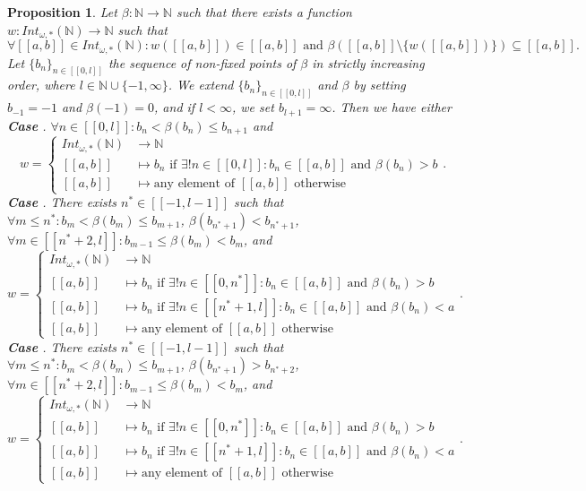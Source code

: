 \documentclass[a4paper,11pt]{article}
\newcommand*\circled[1]{\tikz[baseline=(char.base)]{
            \node[shape=circle,draw,inner sep=2pt] (char) {#1};}}
\theoremstyle{plain}
\newtheorem{proposition}{Proposition}[section]
\theoremstyle{definition}
\theoremstyle{remark}
\begin{document}
\begin{proposition}
\label{propBetaInt}
Let $\beta : \mathbb{N} \to \mathbb{N}$ such that there exists a function $w : Int_{\omega,*}(\mathbb{N}) \to \mathbb{N}$ such that
\[ \forall [\![a,b]\!] \in Int_{\omega,*}(\mathbb{N}) : w([\![a,b]\!]) \in [\![a,b]\!] \text{ and } \beta([\![a,b]\!] \setminus \{w([\![a,b]\!])\}) \subseteq [\![a,b]\!]. \]
Let $\{b_n\}_{n \in [\![0,l]\!]}$ the sequence of non-fixed points of $\beta$ in strictly increasing order, where $l \in \mathbb{N} \cup \{-1, \infty\}$. We extend $\{b_n\}_{n \in [\![0,l]\!]}$ and $\beta$ by setting $b_{-1} = -1$ and $\beta(-1) = 0$, and if $l < \infty$, we set $b_{l+1} = \infty$. Then we have either \\
\textbf{Case \circled{1}}. $\forall n \in [\![0,l]\!] : b_n < \beta(b_n) \leq b_{n+1}$ and
\[ w = \begin{cases} Int_{\omega,*}(\mathbb{N}) &\to \mathbb{N} \\ [\![a,b]\!] &\mapsto b_n \text { if } \exists! n \in [\![0,l]\!] : b_n \in [\![a,b]\!] \text{ and } \beta(b_n) > b \\ [\![a,b]\!] &\mapsto \text{any element of } [\![a,b]\!] \text{ otherwise} \end{cases}. \]
\textbf{Case \circled{2}}. There exists $n^* \in [\![-1,l-1]\!]$ such that $\forall m \leq n^* : b_m < \beta(b_m) \leq b_{m+1}$, $\beta(b_{n^*+1}) < b_{n^*+1}$, $\forall m \in [\![n^*+2,l]\!] : b_{m-1} \leq \beta(b_m) < b_m$, and
\[ w = \begin{cases} Int_{\omega,*}(\mathbb{N}) &\to \mathbb{N} \\ [\![a,b]\!] &\mapsto b_n \text { if } \exists! n \in [\![0,n^*]\!] : b_n \in [\![a,b]\!] \text{ and } \beta(b_n) > b \\ [\![a,b]\!] &\mapsto b_n \text { if } \exists! n \in [\![n^*+1,l]\!] : b_n \in [\![a,b]\!] \text{ and } \beta(b_n) < a \\ [\![a,b]\!] &\mapsto \text{any element of } [\![a,b]\!] \text{ otherwise} \end{cases}. \]
\textbf{Case \circled{3}}. There exists $n^* \in [\![-1,l-1]\!]$ such that $\forall m \leq n^* : b_m < \beta(b_m) \leq b_{m+1}$, $\beta(b_{n^*+1}) > b_{n^*+2}$, $\forall m \in [\![n^*+2,l]\!] : b_{m-1} \leq \beta(b_m) < b_m$, and 
\[ w = \begin{cases} Int_{\omega,*}(\mathbb{N}) &\to \mathbb{N} \\ [\![a,b]\!] &\mapsto b_n \text { if } \exists! n \in [\![0,n^*]\!] : b_n \in [\![a,b]\!] \text{ and } \beta(b_n) > b \\ [\![a,b]\!] &\mapsto b_n \text { if } \exists! n \in [\![n^*+1,l]\!] : b_n \in [\![a,b]\!] \text{ and } \beta(b_n) < a \\ [\![a,b]\!] &\mapsto \text{any element of } [\![a,b]\!] \text{ otherwise} \end{cases}. \]
\end{proposition}
\end{document}

